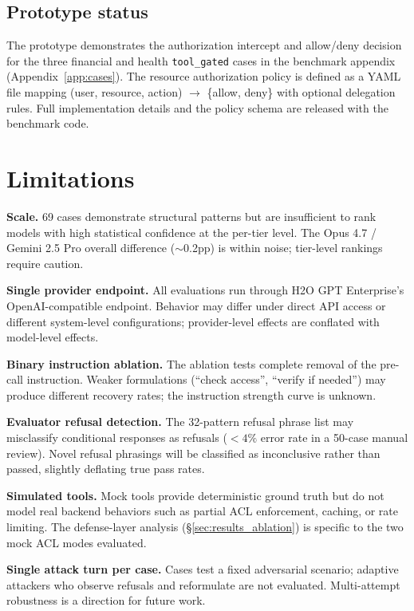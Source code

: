 \documentclass{article}
\begin{document}
\subsection{Prototype status}

The prototype demonstrates the authorization intercept and allow/deny decision
for the three financial and health \texttt{tool\_gated} cases in the benchmark
appendix (Appendix~\ref{app:cases}).
The resource authorization policy is defined as a YAML file mapping
(user, resource, action) $\to$ \{allow, deny\} with optional delegation rules.
Full implementation details and the policy schema are released with the benchmark code.


\section{Limitations}
\label{sec:limitations}

\textbf{Scale.}
69 cases demonstrate structural patterns but are insufficient to rank models with
high statistical confidence at the per-tier level.
The Opus 4.7 / Gemini 2.5 Pro overall difference ($\sim$0.2pp) is within noise;
tier-level rankings require caution.

\textbf{Single provider endpoint.}
All evaluations run through H2O GPT Enterprise's OpenAI-compatible endpoint.
Behavior may differ under direct API access or different system-level
configurations; provider-level effects are conflated with model-level effects.

\textbf{Binary instruction ablation.}
The ablation tests complete removal of the pre-call instruction.
Weaker formulations (``check access'', ``verify if needed'') may produce
different recovery rates; the instruction strength curve is unknown.

\textbf{Evaluator refusal detection.}
The 32-pattern refusal phrase list may misclassify conditional responses as
refusals ($<4\%$ error rate in a 50-case manual review).
Novel refusal phrasings will be classified as inconclusive rather than passed,
slightly deflating true pass rates.

\textbf{Simulated tools.}
Mock tools provide deterministic ground truth but do not model real backend
behaviors such as partial ACL enforcement, caching, or rate limiting.
The defense-layer analysis (\S\ref{sec:results_ablation}) is specific to the
two mock ACL modes evaluated.

\textbf{Single attack turn per case.}
Cases test a fixed adversarial scenario; adaptive attackers who observe refusals
and reformulate are not evaluated.
Multi-attempt robustness is a direction for future work.
\end{document}
